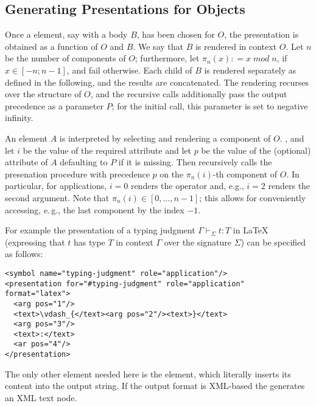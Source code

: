 \subsection{Generating Presentations for {\openmath} Objects}

Once a {} element, say with a body $B$, has been chosen for $O$, the
presentation is obtained as a function of $O$ and $B$. We say that $B$ is rendered in
context $O$. Let $n$ be the number of components of $O$; furthermore, let $\pi_n(x)\colon=x\;mod\;n$, if $x\in[-n;n-1]$, and fail otherwise. Each child of $B$ is rendered separately as defined in the following, and the results are concatenated. The rendering recurses over the structure of $O$, and the recursive calls additionally pass the output precedence as a parameter $P$; for the initial call, this parameter is set to negative infinity.

An {} element $A$ is interpreted by selecting and rendering a component of $O$.
, and let $i$ be the value of the required
attribute {} and let $p$ be the value of the (optional) attribute
{} of $A$ defaulting to $P$ if it is missing. Then {} recursively calls the
presenation procedure with precedence $p$ on the $\pi_n(i)$-th
component of $O$. In particular, for applications, $i=0$ renders the operator and, e.g., $i=2$ renders the second argument. Note that $\pi_n(i)\in [0,\ldots,n-1]$; this allows for conveniently
accessing, e.\,g., the last component by the index $-1$.

For example the presentation of a typing judgment $\Gamma\vdash_\Sigma t:T$ in {\LaTeX}
(expressing that $t$ has type $T$ in context $\Gamma$ over the signature $\Sigma$) can be
specified as follows:
\begin{lstlisting}[mathescape,label={lst:typing-judgment},
                   caption={Presenting a Typing Judgment}]
<symbol name="typing-judgment" role="application"/>
<presentation for="#typing-judgment" role="application" format="latex">
  <arg pos="1"/>
  <text>\vdash_{</text><arg pos="2"/><text>}</text>
  <arg pos="3"/>
  <text>:</text>
  <ar pos="4"/>
</presentation>
\end{lstlisting}
The only other element needed here is the {} element, which literally
inserts its content into the output string. If the output format is XML-based the
{} generates an XML text node.

